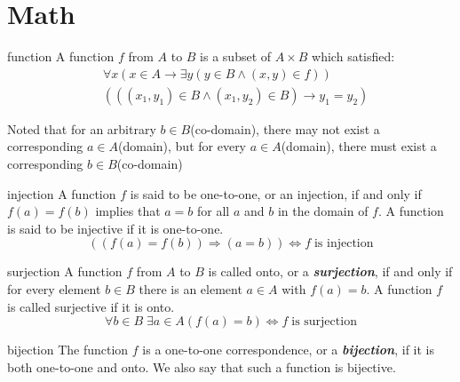 \section{Math}

\begin{Definition}{function}
	A function $f$ from $A$ to $B$ is a subset of $A \times B$ which satisfied:
	\begin{equation}
	\begin{aligned}
			&\forall x (x \in A \rightarrow \exists y (y \in B \land (x,y) \in f)) \\
			&(((x_1, y_1) \in B \land (x_1, y_2) \in B) \rightarrow y_1 = y_2)
	\end{aligned}
	\end{equation}	
\end{Definition}

Noted that for an arbitrary $b \in B$(co-domain), there may not exist a corresponding $a \in A$(domain), but for every $a \in A$(domain), there must exist a corresponding $b \in B$(co-domain)

\begin{Definition}{injection}
A function $f$ is said to be one-to-one, or an injection, if and only if $f (a) = f (b)$ implies that $a = b$ for all $a$ and $b$ in the domain of $f$. A function is said to be injective if it is one-to-one.
\[ ((f(a) = f(b)) \Rightarrow (a = b)) \Leftrightarrow f \; \text{is injection} \]
\end{Definition}


\begin{Definition}{surjection}
A function $f$ from $A$ to $B$ is called onto, or a \textbf{\textit{surjection}}, if and only if for every element $b \in B$ there is an element $a \in A$ with $f(a) = b$. A function $f$ is called surjective if it is onto.
\[ \forall b \in B \; \exists a \in A (f(a) = b) \Leftrightarrow f \; \text{is surjection} \]
\end{Definition}


\begin{Definition}{bijection}
The function $f$ is a one-to-one correspondence, or a \textbf{\textit{bijection}},
if it is both one-to-one and onto. We also say that such a function is bijective.
\end{Definition}

